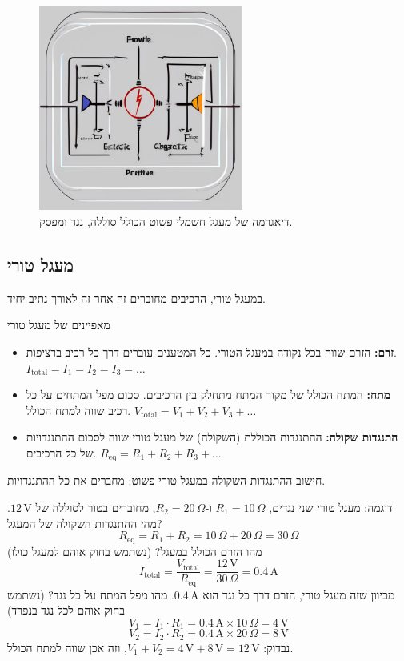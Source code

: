 \documentclass[12pt]{article}
\begin{document}
\begin{figure}[H]
  \centering
  \includegraphics[width=0.6\textwidth]{files/simple_circuit_diagram.png}
  \caption{דיאגרמה של מעגל חשמלי פשוט הכולל סוללה, נגד ומפסק.}
\end{figure}

\subsection{מעגל טורי}
במעגל טורי, הרכיבים מחוברים זה אחר זה לאורך נתיב יחיד.

\begin{remarkBox}{מאפיינים של מעגל טורי}
\begin{itemize}
    \item \textbf{זרם:} הזרם שווה בכל נקודה במעגל הטורי. כל המטענים עוברים דרך כל רכיב ברציפות. \(I_{\text{total}} = I_1 = I_2 = I_3 = \dots\)
    \item \textbf{מתח:} המתח הכולל של מקור המתח מתחלק בין הרכיבים. סכום מפל המתחים על כל רכיב שווה למתח הכולל. \(V_{\text{total}} = V_1 + V_2 + V_3 + \dots\)
    \item \textbf{התנגדות שקולה:} ההתנגדות הכוללת (השקולה) של מעגל טורי שווה לסכום ההתנגדויות של כל הרכיבים. \(R_{\text{eq}} = R_1 + R_2 + R_3 + \dots\)
\end{itemize}
\end{remarkBox}

חישוב ההתנגדות השקולה במעגל טורי פשוט: מחברים את כל ההתנגדויות.

\begin{exampleBox}{דוגמה: מעגל טורי}
שני נגדים, \(R_1 = 10 \, \Omega\) ו-\(R_2 = 20 \, \Omega\), מחוברים בטור לסוללה של \(12 \, \text{V}\).
מהי ההתנגדות השקולה של המעגל?
\[R_{\text{eq}} = R_1 + R_2 = 10 \, \Omega + 20 \, \Omega = 30 \, \Omega\]
מהו הזרם הכולל במעגל? (נשתמש בחוק אוהם למעגל כולו)
\[I_{\text{total}} = \frac{V_{\text{total}}}{R_{\text{eq}}} = \frac{12 \, \text{V}}{30 \, \Omega} = 0.4 \, \text{A}\]
מכיוון שזה מעגל טורי, הזרם דרך כל נגד הוא \(0.4 \, \text{A}\).
מהו מפל המתח על כל נגד? (נשתמש בחוק אוהם לכל נגד בנפרד)
\[V_1 = I_1 \cdot R_1 = 0.4 \, \text{A} \times 10 \, \Omega = 4 \, \text{V}\]
\[V_2 = I_2 \cdot R_2 = 0.4 \, \text{A} \times 20 \, \Omega = 8 \, \text{V}\]
נבדוק: \(V_1 + V_2 = 4 \, \text{V} + 8 \, \text{V} = 12 \, \text{V}\), וזה אכן שווה למתח הכולל.
\end{exampleBox}
\end{document}
